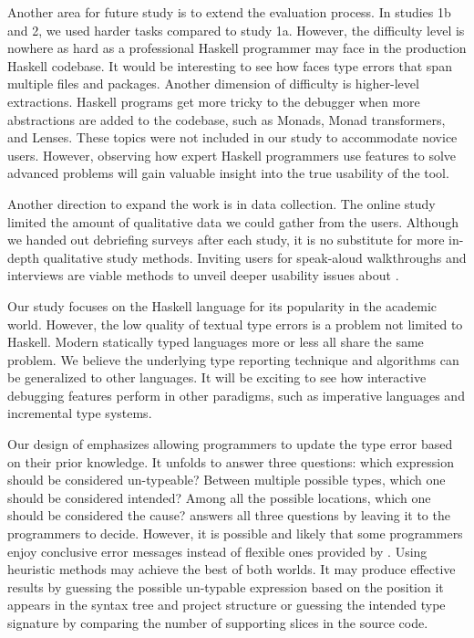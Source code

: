 Another area for future study is to extend the evaluation process. In studies 1b and 2, we used harder tasks compared to study 1a. However, the difficulty level is nowhere as hard as a professional Haskell programmer may face in the production Haskell codebase. It would be interesting to see how \chameleon{}  faces type errors that span multiple files and packages. Another dimension of difficulty is higher-level extractions. Haskell programs get more tricky to the debugger when more abstractions are added to the codebase, such as Monads, Monad transformers, and Lenses. These topics were not included in our study to accommodate novice users. However, observing how expert Haskell programmers use \chameleon{} features to solve advanced problems will gain valuable insight into the true usability of the tool.

Another direction to expand the work is in data collection. The online study limited the amount of qualitative data we could gather from the users. Although we handed out debriefing surveys after each study, it is no substitute for more in-depth qualitative study methods. Inviting users for speak-aloud walkthroughs and interviews are viable methods to unveil deeper usability issues about \chameleon{}.

Our study focuses on the Haskell language for its popularity in the academic world. However, the low quality of textual type errors is a problem not limited to Haskell. Modern statically typed languages more or less all share the same problem. We believe the underlying type reporting technique and algorithms can be generalized to other languages. It will be exciting to see how interactive debugging features perform in other paradigms, such as  imperative languages and incremental type systems.

Our design of \chameleon{}  emphasizes allowing programmers to update the type error based on their prior knowledge. It unfolds to answer three questions: which expression should be considered un-typeable? Between multiple possible types, which one should be considered intended? Among all the possible locations, which one should be considered the cause? \chameleon{} answers all three questions by leaving it to the programmers to decide. However, it is possible and likely that some programmers enjoy conclusive error messages instead of flexible ones provided by \chameleon{}. Using heuristic methods may achieve the best of both worlds. It may produce effective results by guessing the possible un-typable expression based on the position it appears in the syntax tree and project structure or guessing the intended type signature by comparing the number of supporting slices in the source code.

